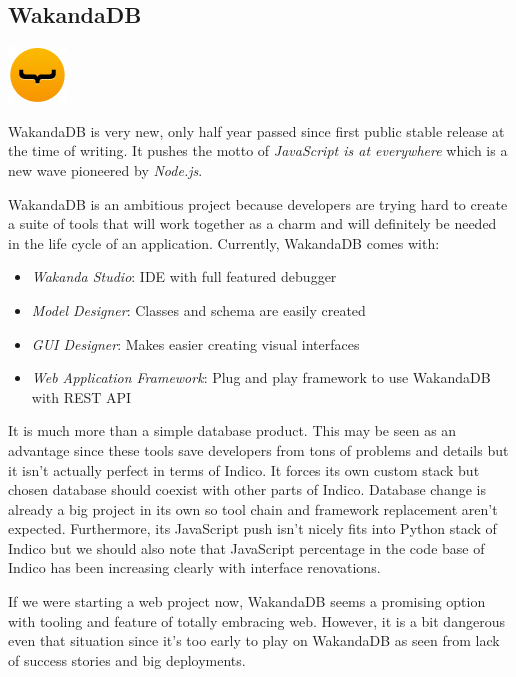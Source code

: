\subsection{WakandaDB}

\vspace{-1.15cm} \hspace{4.1cm} \includegraphics[scale=0.8]{3/figures/wakandadb.png}

WakandaDB is very new, only half year passed since first public stable release at the time of writing. It pushes the motto of \textit{JavaScript is at everywhere} which is a new wave pioneered by \textit{Node.js}.

WakandaDB is an ambitious project because developers are trying hard to create a suite of tools that will work together as a charm and will definitely be needed in the life cycle of an application. Currently, WakandaDB comes with:
\begin{itemize}
  \item \textit{Wakanda Studio}: IDE with full featured debugger
  \item \textit{Model Designer}: Classes and schema are easily created
  \item \textit{GUI Designer}: Makes easier creating visual interfaces
  \item \textit{Web Application Framework}: Plug and play framework to use WakandaDB with REST API
\end{itemize}

It is much more than a simple database product. This may be seen as an advantage since these tools save developers from tons of problems and details but it isn't actually perfect in terms of Indico. It forces its own custom stack but chosen database should coexist with other parts of Indico. Database change is already a big project in its own so tool chain and framework replacement aren't expected. Furthermore, its JavaScript push isn't nicely fits into Python stack of Indico but we should also note that JavaScript percentage in the code base of Indico has been increasing clearly with interface renovations.

If we were starting a web project now, WakandaDB seems a promising option with tooling and feature of totally embracing web. However, it is a bit dangerous even that situation since it's too early to play on WakandaDB as seen from lack of success stories and big deployments.

